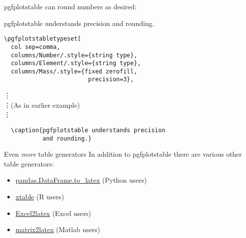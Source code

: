 \begin{frame}{}
  pgfplotstable can round numbers as desired:
  \begin{table}
    \caption{pgfplotstable understands precision and rounding.}
  \end{table}
\end{frame}

\begin{frame}[fragile]{}
  \begin{lstlisting}
\pgfplotstabletypeset[
  col sep=comma,
  columns/Number/.style={string type},
  columns/Element/.style={string type},
  columns/Mass/.style={fixed zerofill, 
                        precision=3},
  \end{lstlisting}
\vspace{-0.5cm}\hspace{0.25cm}\vdots \\
\hspace{0.25cm}\vdots\quad(As in earlier example) \\
\hspace{0.25cm}\vdots
  \begin{lstlisting}
  \caption{pgfplotstable understands precision
           and rounding.}
  \end{lstlisting}
\end{frame}

\begin{frame}{Even \textit{more} table generators}
  In addition to pgfplotstable there are various other table generators:
  \begin{itemize}
    \item \href{https://pandas.pydata.org/pandas-docs/stable/generated/pandas.DataFrame.to_latex.html}%
      {pandas.DataFrame.to\_latex} (Python users)
    \item \href{https://www.rdocumentation.org/packages/xtable/versions/1.8-3/topics/xtable}%
      {xtable} (R users)
    \item \href{https://ctan.org/pkg/excel2latex?lang=en}{Excel2latex}
      (Excel users)
    \item \href{https://uk.mathworks.com/matlabcentral/fileexchange/4894-matrix2latex?s_tid=FX_rc2_behav}%
      {matrix2latex} (Matlab users)
  \end{itemize}
\end{frame}

